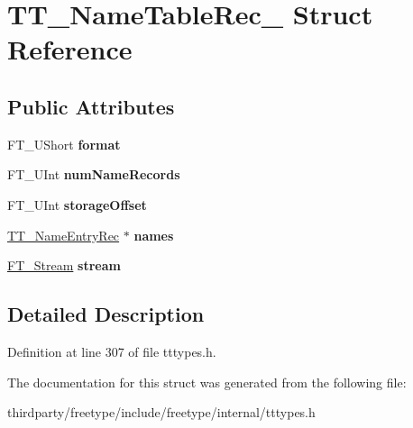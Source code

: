 \hypertarget{struct_t_t___name_table_rec__}{}\section{T\+T\+\_\+\+Name\+Table\+Rec\+\_\+ Struct Reference}
\label{struct_t_t___name_table_rec__}
\subsection*{Public Attributes}
\begin{DoxyCompactItemize}
\item 
\mbox{\label{struct_t_t___name_table_rec___a762c5431cbe285cb7153bb5650710fb0}} 
F\+T\+\_\+\+U\+Short {\bfseries format}
\item 
\mbox{\label{struct_t_t___name_table_rec___a5b565d940b9d02bb69cd19da5cda61b8}} 
F\+T\+\_\+\+U\+Int {\bfseries num\+Name\+Records}
\item 
\mbox{\label{struct_t_t___name_table_rec___a4ed1f4e78e39b2e206411e9ea4d23801}} 
F\+T\+\_\+\+U\+Int {\bfseries storage\+Offset}
\item 
\mbox{\label{struct_t_t___name_table_rec___a693aed17954386eb8fb5fd7f69d5b551}} 
\hyperlink{struct_t_t___name_entry_rec__}{T\+T\+\_\+\+Name\+Entry\+Rec} $\ast$ {\bfseries names}
\item 
\mbox{\label{struct_t_t___name_table_rec___a97109aec8cd7ca13f6627f3fee15d48d}} 
\hyperlink{struct_f_t___stream_rec__}{F\+T\+\_\+\+Stream} {\bfseries stream}
\end{DoxyCompactItemize}


\subsection{Detailed Description}


Definition at line 307 of file tttypes.\+h.



The documentation for this struct was generated from the following file\+:\begin{DoxyCompactItemize}
\item 
thirdparty/freetype/include/freetype/internal/tttypes.\+h\end{DoxyCompactItemize}
